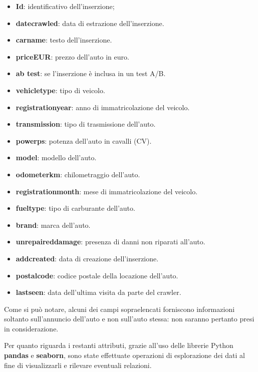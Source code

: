 \begin{itemize}
    \item \textbf{Id}: identificativo dell'inserzione;
    \item \textbf{date\textunderscore crawled}: data di estrazione dell'inserzione.
    \item \textbf{car\textunderscore name}: testo dell'inserzione.
    \item \textbf{price\textunderscore EUR}: prezzo dell'auto in euro.
    \item \textbf{ab \textunderscore test}: se l'inserzione è inclusa in un test A/B.
    \item \textbf{vehicle\textunderscore type}: tipo di veicolo.
    \item \textbf{registration\textunderscore year}: anno di immatricolazione del veicolo.
    \item \textbf{transmission}: tipo di trasmissione dell'auto.
    \item \textbf{power\textunderscore ps}: potenza dell'auto in cavalli (CV).
    \item \textbf{model}: modello dell'auto. 
    \item \textbf{odometer\textunderscore km}: chilometraggio dell'auto.
    \item\textbf{registration\textunderscore month}: mese di immatricolazione del veicolo.
    \item \textbf{fuel\textunderscore type}: tipo di carburante dell'auto.
    \item \textbf{brand}: marca dell'auto.
    \item \textbf{unrepaired\textunderscore damage}: presenza di danni non riparati all'auto.
    \item \textbf{add\textunderscore created}: data di creazione dell'inserzione.
    \item \textbf{postal\textunderscore code}: codice postale della locazione dell'auto.
    \item \textbf{last\textunderscore seen}: data dell'ultima visita da parte del crawler.
\end{itemize}
Come si può notare, alcuni dei campi sopraelencati forniscono informazioni soltanto sull'annuncio dell'auto e non sull'auto stessa: non saranno pertanto presi in considerazione.

Per quanto riguarda i restanti attributi, grazie all'uso delle librerie \mbox{Python} \textbf{pandas} e \textbf{seaborn}, sono state effettuate operazioni di esplorazione dei dati al fine di visualizzarli e rilevare eventuali relazioni.


